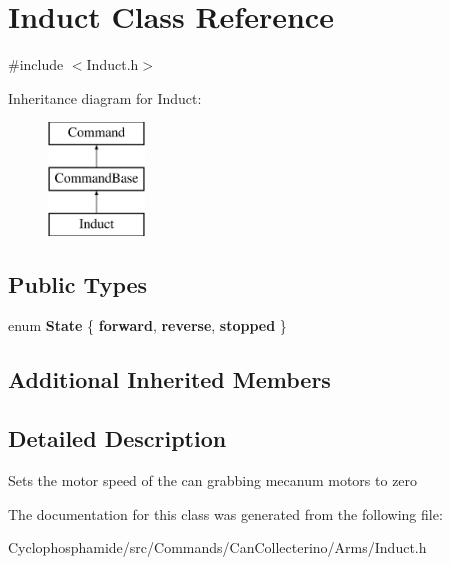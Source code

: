 \hypertarget{class_induct}{}\section{Induct Class Reference}
\label{class_induct}


{\ttfamily \#include $<$Induct.\+h$>$}

Inheritance diagram for Induct\+:\begin{figure}[H]
\begin{center}
\leavevmode
\includegraphics[height=3.000000cm]{class_induct}
\end{center}
\end{figure}
\subsection*{Public Types}
\begin{DoxyCompactItemize}
\item 
\hypertarget{class_induct_adc43ac1536652faf673be7938fa75f39}{}enum {\bfseries State} \{ {\bfseries forward}, 
{\bfseries reverse}, 
{\bfseries stopped}
 \}\label{class_induct_adc43ac1536652faf673be7938fa75f39}

\end{DoxyCompactItemize}
\subsection*{Additional Inherited Members}


\subsection{Detailed Description}
Sets the motor speed of the can grabbing mecanum motors to zero 

The documentation for this class was generated from the following file\+:\begin{DoxyCompactItemize}
\item 
Cyclophosphamide/src/\+Commands/\+Can\+Collecterino/\+Arms/Induct.\+h\end{DoxyCompactItemize}
